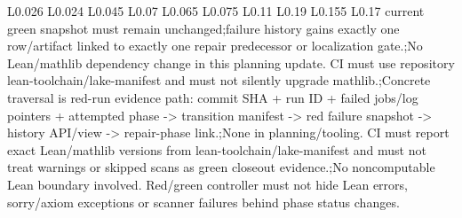 \begin{longtable}{L{0.026\linewidth} L{0.024\linewidth} L{0.045\linewidth} L{0.07\linewidth} L{0.065\linewidth} L{0.075\linewidth} L{0.11\linewidth} L{0.19\linewidth} L{0.155\linewidth} L{0.17\linewidth}}
current green snapshot must remain unchanged;\newline failure history gains exactly one row/\allowbreak{}artifact linked to exactly one repair predecessor or localization gate.;\newline No Lean/\allowbreak{}mathlib dependency change in this planning update. CI must use repository lean-toolchain/\allowbreak{}lake-manifest and must not silently upgrade mathlib.;\newline Concrete traversal is red-run evidence path: commit SHA + run ID + failed jobs/\allowbreak{}log pointers + attempted phase -> transition manifest -> red failure snapshot -> history API/\allowbreak{}view -> repair-phase link.;\newline None in planning/\allowbreak{}tooling. CI must report exact Lean/\allowbreak{}mathlib versions from lean-toolchain/\allowbreak{}lake-manifest and must not treat warnings or skipped scans as green closeout evidence.;\newline No noncomputable Lean boundary involved. Red/\allowbreak{}green controller must not hide Lean errors, sorry/\allowbreak{}axiom exceptions or scanner failures behind phase status changes.\\
\hline
\addlinespace[0.24em]

\end{longtable}
